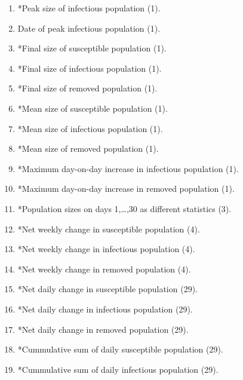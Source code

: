 \documentclass[11pt,a4paper]{article}
\theoremstyle{break}
\begin{document}
  \begin{table}[H]
    \centering
    \begin{framed}
      {\small
        \begin{multicols}{2}
          \begin{enumerate}[label=(S\arabic*)]
            \item *Peak size of infectious population (1).\label{table_list_of_summary_statistics_peak_size}
            \item Date of peak infectious population (1).\label{table_list_of_summary_statistics_peak_date}
            \item *Final size of susceptible population (1).\label{table_list_of_summary_statistics_final_sus}
            \item *Final size of infectious population (1).
            \item *Final size of removed population (1).
            \item *Mean size of susceptible population (1).
            \item *Mean size of infectious population (1).\label{table_list_of_summary_statistics_mean_inf}
            \item *Mean size of removed population (1).\label{table_list_of_summary_statistics_mean_rem}
            \item *Maximum day-on-day increase in infectious population (1).
            \item *Maximum day-on-day increase in removed population (1).
            \item *Population sizes on days 1,\dots,30 as different statistics (3).\label{table_list_of_summary_statistics_daily}
            \item *Net weekly change in susceptible population (4).
            \item *Net weekly change in infectious population (4).
            \item *Net weekly change in removed population (4).
            \item *Net daily change in susceptible population (29).
            \item *Net daily change in infectious population (29).
            \item *Net daily change in removed population (29).
            \item *Cummulative sum of daily susceptible population (29).
            \item *Cummulative sum of daily infectious population (29).

\end{enumerate}
\end{multicols}}
\end{framed}
\end{table}
\end{document}
